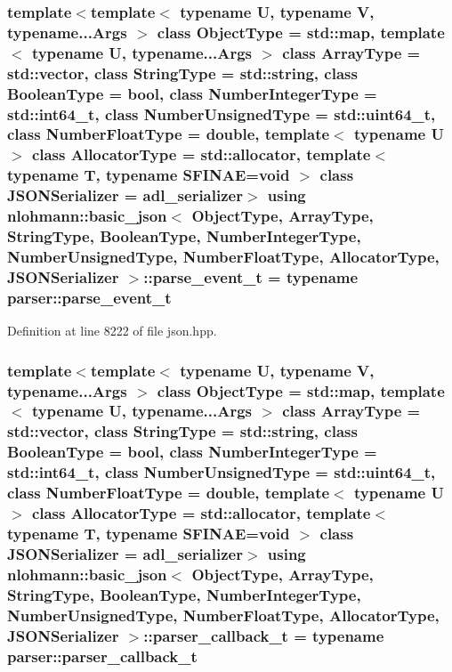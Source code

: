 \subsubsection[{\texorpdfstring{parse\+\_\+event\+\_\+t}{parse_event_t}}]{\setlength{\rightskip}{0pt plus 5cm}template$<$template$<$ typename U, typename V, typename...\+Args $>$ class Object\+Type = std\+::map, template$<$ typename U, typename...\+Args $>$ class Array\+Type = std\+::vector, class String\+Type  = std\+::string, class Boolean\+Type  = bool, class Number\+Integer\+Type  = std\+::int64\+\_\+t, class Number\+Unsigned\+Type  = std\+::uint64\+\_\+t, class Number\+Float\+Type  = double, template$<$ typename U $>$ class Allocator\+Type = std\+::allocator, template$<$ typename T, typename S\+F\+I\+N\+A\+E=void $>$ class J\+S\+O\+N\+Serializer = adl\+\_\+serializer$>$ using {\bf nlohmann\+::basic\+\_\+json}$<$ Object\+Type, Array\+Type, String\+Type, Boolean\+Type, Number\+Integer\+Type, Number\+Unsigned\+Type, Number\+Float\+Type, Allocator\+Type, J\+S\+O\+N\+Serializer $>$\+::{\bf parse\+\_\+event\+\_\+t} =  typename {\bf parser\+::parse\+\_\+event\+\_\+t}}\hypertarget{classnlohmann_1_1basic__json_aaceba2e4cf75fc983bb75c78c8742e65}{}\label{classnlohmann_1_1basic__json_aaceba2e4cf75fc983bb75c78c8742e65}


Definition at line 8222 of file json.\+hpp.

\subsubsection[{\texorpdfstring{parser\+\_\+callback\+\_\+t}{parser_callback_t}}]{\setlength{\rightskip}{0pt plus 5cm}template$<$template$<$ typename U, typename V, typename...\+Args $>$ class Object\+Type = std\+::map, template$<$ typename U, typename...\+Args $>$ class Array\+Type = std\+::vector, class String\+Type  = std\+::string, class Boolean\+Type  = bool, class Number\+Integer\+Type  = std\+::int64\+\_\+t, class Number\+Unsigned\+Type  = std\+::uint64\+\_\+t, class Number\+Float\+Type  = double, template$<$ typename U $>$ class Allocator\+Type = std\+::allocator, template$<$ typename T, typename S\+F\+I\+N\+A\+E=void $>$ class J\+S\+O\+N\+Serializer = adl\+\_\+serializer$>$ using {\bf nlohmann\+::basic\+\_\+json}$<$ Object\+Type, Array\+Type, String\+Type, Boolean\+Type, Number\+Integer\+Type, Number\+Unsigned\+Type, Number\+Float\+Type, Allocator\+Type, J\+S\+O\+N\+Serializer $>$\+::{\bf parser\+\_\+callback\+\_\+t} =  typename {\bf parser\+::parser\+\_\+callback\+\_\+t}}\hypertarget{classnlohmann_1_1basic__json_ab4f78c5f9fd25172eeec84482e03f5b7}{}\label{classnlohmann_1_1basic__json_ab4f78c5f9fd25172eeec84482e03f5b7}


